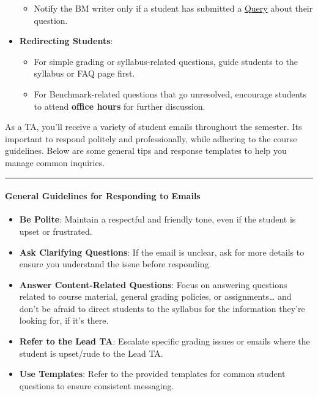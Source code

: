 \documentclass[
]{article}
\providecommand{\tightlist}{%
  \setlength{\itemsep}{0pt}\setlength{\parskip}{0pt}}
\begin{document}
\begin{itemize}
  \begin{itemize}
  \tightlist
  \item
    Notify the BM writer only if a student has submitted a \protect\hyperlink{benchmark-queries}{Query} about their question.
  \end{itemize}
\item
  \textbf{Redirecting Students}:

  \begin{itemize}
  \tightlist
  \item
    For simple grading or syllabus-related questions, guide students to the syllabus or FAQ page first.
  \item
    For Benchmark-related questions that go unresolved, encourage students to attend \textbf{office hours} for further discussion.
  \end{itemize}
\end{itemize}

As a TA, you'll receive a variety of student emails throughout the semester. Its important to respond politely and professionally, while adhering to the course guidelines. Below are some general tips and response templates to help you manage common inquiries.

\begin{center}\rule{0.5\linewidth}{0.5pt}\end{center}

\hypertarget{general-guidelines-for-responding-to-emails}{%
\paragraph{General Guidelines for Responding to Emails}\label{general-guidelines-for-responding-to-emails}}

\begin{itemize}
\tightlist
\item
  \textbf{Be Polite}: Maintain a respectful and friendly tone, even if the student is upset or frustrated.
\item
  \textbf{Ask Clarifying Questions}: If the email is unclear, ask for more details to ensure you understand the issue before responding.
\item
  \textbf{Answer Content-Related Questions}: Focus on answering questions related to course material, general grading policies, or assignments\ldots{} and don't be afraid to direct students to the syllabus for the information they're looking for, if it's there.
\item
  \textbf{Refer to the Lead TA}: Escalate specific grading issues or emails where the student is upset/rude to the Lead TA.
\item
  \textbf{Use Templates}: Refer to the provided templates for common student questions to ensure consistent messaging.
\end{itemize}
\end{document}
